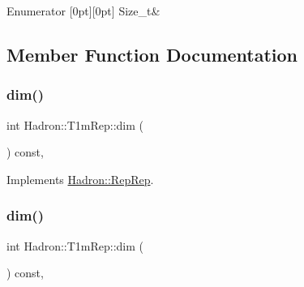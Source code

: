 \begin{DoxyEnumFields}{Enumerator}
[0pt][0pt]{}\mbox{\label{structHadron_1_1T1mRep_a6344153f7b0f23e2946649b06b139db2a4f817982fd5f82d5f1e1d9126415dbc2}} 
Size\+\_\+t&\\
\hline

\end{DoxyEnumFields}


\subsection{Member Function Documentation}
\mbox{\label{structHadron_1_1T1mRep_a6752f30731a94469c77ea15a78ddf9d9}} 
\subsubsection{\texorpdfstring{dim()}{dim()}\hspace{0.1cm}{\footnotesize\ttfamily [1/3]}}
{\footnotesize\ttfamily int Hadron\+::\+T1m\+Rep\+::dim (\begin{DoxyParamCaption}{ }\end{DoxyParamCaption}) const\hspace{0.3cm}{\ttfamily [inline]}, {\ttfamily [virtual]}}



Implements \mbox{\hyperlink{structHadron_1_1RepRep_a92c8802e5ed7afd7da43ccfd5b7cd92b}{Hadron\+::\+Rep\+Rep}}.

\mbox{\label{structHadron_1_1T1mRep_a6752f30731a94469c77ea15a78ddf9d9}} 
\subsubsection{\texorpdfstring{dim()}{dim()}\hspace{0.1cm}{\footnotesize\ttfamily [2/3]}}
{\footnotesize\ttfamily int Hadron\+::\+T1m\+Rep\+::dim (\begin{DoxyParamCaption}{ }\end{DoxyParamCaption}) const\hspace{0.3cm}{\ttfamily [inline]}, {\ttfamily [virtual]}}



